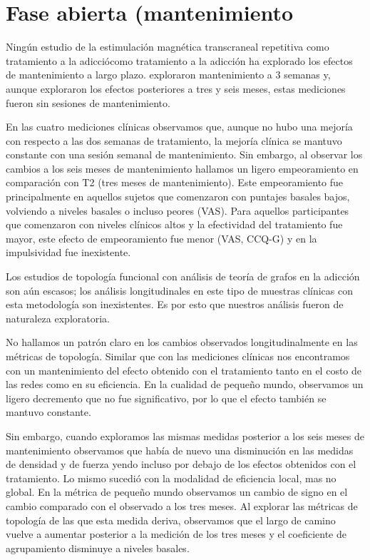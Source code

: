 \section{Fase abierta (mantenimiento}
Ningún estudio de la estimulación magnética transcraneal repetitiva como tratamiento a la adicciócomo tratamiento a la adicción ha explorado los efectos de mantenimiento a largo plazo. \textcite{Terraneo2016} exploraron mantenimiento a 3 semanas y, aunque \textcite{Bolloni2016} exploraron los efectos posteriores a tres y seis meses, estas mediciones fueron sin sesiones de mantenimiento.\par
En las cuatro mediciones clínicas observamos que, aunque no hubo una mejoría con respecto a las dos semanas de tratamiento, la mejoría clínica se mantuvo constante con una sesión semanal de mantenimiento.
Sin embargo, al observar los cambios a los seis meses de mantenimiento hallamos un ligero empeoramiento en comparación con T2 (tres meses de mantenimiento). Este empeoramiento fue principalmente en aquellos sujetos que comenzaron con puntajes basales bajos, volviendo a niveles basales o incluso peores (VAS). Para aquellos participantes que comenzaron con niveles clínicos altos y la efectividad del tratamiento fue mayor, este efecto de empeoramiento fue menor (VAS, CCQ-G) y en la impulsividad fue inexistente.

Los estudios de topología funcional con análisis de teoría de grafos en la adicción son aún escasos; los análisis longitudinales en este tipo de muestras clínicas con esta metodología son inexistentes. Es por esto que nuestros análisis fueron de naturaleza exploratoria.\par
No hallamos un patrón claro en los cambios observados longitudinalmente en las métricas de topología. Similar que con las mediciones clínicas nos encontramos con un mantenimiento del efecto obtenido con el tratamiento tanto en el costo de las redes como en su eficiencia. En la cualidad de pequeño mundo, observamos un ligero decremento que no fue significativo, por lo que el efecto también se mantuvo constante. \par
Sin embargo, cuando exploramos las mismas medidas posterior a los seis meses de mantenimiento observamos que había de nuevo una disminución en las medidas de densidad y de fuerza yendo incluso por debajo de los efectos obtenidos con el tratamiento. Lo mismo sucedió con la modalidad de eficiencia local, mas no global. En la métrica de pequeño mundo observamos un cambio de signo en el cambio comparado con el observado a los tres meses. Al explorar las métricas de topología de las que esta medida deriva, observamos que el largo de camino vuelve a aumentar posterior a la medición de los tres meses y el coeficiente de agrupamiento disminuye a niveles basales. \par

